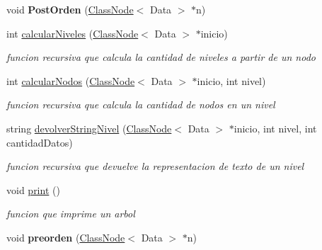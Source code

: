 \begin{DoxyCompactItemize}
\item 
\mbox{\label{class_binary_search_tree_a2119d18706ac114900c67d828c7ad476}} 
void {\bfseries Post\+Orden} (\hyperlink{class_class_node}{Class\+Node}$<$ Data $>$ $\ast$n)
\item 
int \hyperlink{class_binary_search_tree_a922ad2464f2085d208847a76fca1bb51}{calcular\+Niveles} (\hyperlink{class_class_node}{Class\+Node}$<$ Data $>$ $\ast$inicio)
\begin{DoxyCompactList}\small\item\em funcion recursiva que calcula la cantidad de niveles a partir de un nodo \end{DoxyCompactList}\item 
int \hyperlink{class_binary_search_tree_adb25fc678a13dbaa05ba0c0627eb232e}{calcular\+Nodos} (\hyperlink{class_class_node}{Class\+Node}$<$ Data $>$ $\ast$inicio, int nivel)
\begin{DoxyCompactList}\small\item\em funcion recursiva que calcula la cantidad de nodos en un nivel \end{DoxyCompactList}\item 
string \hyperlink{class_binary_search_tree_a30a79ed298da4d6fe4395dddd53842b8}{devolver\+String\+Nivel} (\hyperlink{class_class_node}{Class\+Node}$<$ Data $>$ $\ast$inicio, int nivel, int cantidad\+Datos)
\begin{DoxyCompactList}\small\item\em funcion recursiva que devuelve la representacion de texto de un nivel \end{DoxyCompactList}\item 
\mbox{\label{class_binary_search_tree_af6e24d171e86e3c3a9092dbb822e4411}} 
void \hyperlink{class_binary_search_tree_af6e24d171e86e3c3a9092dbb822e4411}{print} ()
\begin{DoxyCompactList}\small\item\em funcion que imprime un arbol \end{DoxyCompactList}\item 
\mbox{\label{class_binary_search_tree_ad1ef774f107b357863b1b578d0723553}} 
void {\bfseries preorden} (\hyperlink{class_class_node}{Class\+Node}$<$ Data $>$ $\ast$n)
\end{DoxyCompactItemize}
